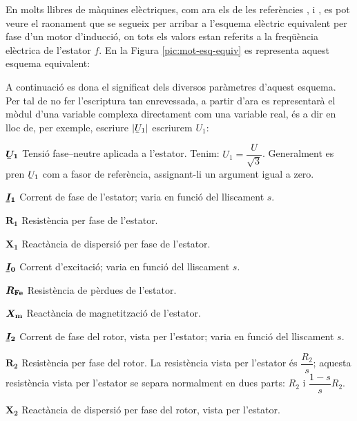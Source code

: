 En molts llibres de màquines elèctriques, com ara els de les referències \cite{CHA}, \cite{FIT} i \cite{JFM}, es pot veure el raonament que se segueix per arribar a l'esquema elèctric equivalent per fase d'un motor d'inducció, on tots els valors estan referits a la freqüència elèctrica de l'estator $f$. En la Figura \vref{pic:mot-esq-equiv} es representa aquest esquema equivalent:

\begin{center}
    
    \label{pic:mot-esq-equiv}
\end{center}

A continuació es dona el significat dels diversos paràmetres d'aquest esquema. Per tal de no fer l'escriptura tan enrevessada, a partir d'ara es representarà el mòdul d'una variable complexa  directament com una variable real, és a dir en lloc de, per exemple, escriure $|\cmplx{U}_1|$ escriurem $U_1$:

\begin{list}{}
   {\setlength{\labelwidth}{12mm} \setlength{\leftmargin}{12mm} \setlength{\labelsep}{2mm}}
   \item[$\boldsymbol{\cmplx{U}_1}$] Tensió fase--neutre aplicada a l'estator. Tenim: $U_1 = \dfrac{U}{\sqrt{3}}$. Generalment   es pren $\cmplx{U}_1$ com a fasor de referència, assignant-li un argument igual a zero.
   \item[$\boldsymbol{\cmplx{I}_1}$] Corrent de fase de l'estator; varia en funció del lliscament $s$.
   \item[$\boldsymbol{R_1}$] Resistència per fase de l'estator.
   \item[$\boldsymbol{X_1}$] Reactància de dispersió per fase de l'estator.
   \item[$\boldsymbol{\cmplx{I}_0}$] Corrent d'excitació; varia en funció del lliscament $s$.
   \item[$\boldsymbol{R_\mathrm{Fe}}$] Resistència de pèrdues de l'estator.
   \item[$\boldsymbol{X_\mathrm{m}}$] Reactància de magnetització de l'estator.
   \item[$\boldsymbol{\cmplx{I}_2}$] Corrent de fase del rotor, vista per l'estator; varia en funció del lliscament $s$.
   \item[$\boldsymbol{R_2}$] Resistència per fase del rotor. La resistència vista per l'estator és $\dfrac{R_2}{s}$; aquesta resistència vista per l'estator se separa normalment en dues parts: $R_2$ i $\dfrac{1-s}{s} R_2$.
   \item[$\boldsymbol{X_2}$] Reactància de dispersió per fase del rotor, vista per l'estator.
\end{list}

